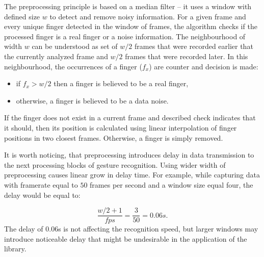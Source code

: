 The preprocessing principle is based on a median filter -- it uses a window with defined size $w$ to detect and remove noisy information. 
For a given frame and every unique finger detected in the window of frames, the algorithm checks if the processed finger is a real finger or a noise information.
The neighbourhood of width $w$ can be understood as set of $w/2$ frames that were recorded earlier that the currently analyzed frame and $w/2$ frames that were recorded later. 
In this neighbourhood, the occurrences of a finger ($f_x$) are counter and decision is made:

\begin{itemize}
\item if $f_x > w/2$ then a finger is believed to be a real finger,
\item otherwise, a finger is believed to be a data noise.
\end{itemize}

If the finger does not exist in a current frame and described check indicates that it should, then its position is calculated using linear interpolation of finger positions in two closest frames. Otherwise, a finger is simply removed.

It is worth noticing, that preprocessing introduces delay in data transmission to the next processing blocks of gesture recognition. 
Using wider width of preprocessing causes linear grow in delay time.
For example, while capturing data with framerate equal to $50$ frames per second and a window size equal four, the delay would be equal to:

\begin{equation}
 \frac{w/2+1}{fps} = \frac{3}{50} = 0.06s.
\end{equation}
The delay of $0.06$s is not affecting the recognition speed, but larger windows may introduce noticeable delay that might be undesirable in the application of the library. 
